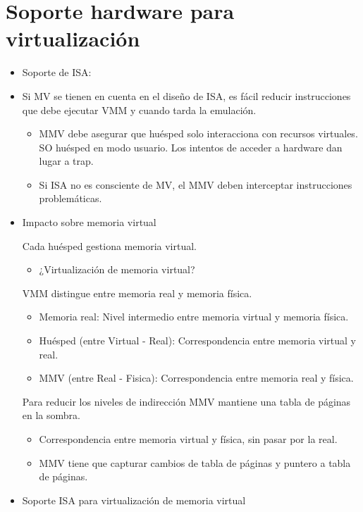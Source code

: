 \documentclass[12pt, twoside, openright]{report} %
\begin{document}
    
\section{Soporte hardware para virtualización}

  \begin{itemize}
  \item
    Soporte de ISA:
  \item
    Si MV se tienen en cuenta en el diseño de ISA, es fácil reducir
    instrucciones que debe ejecutar VMM y cuando tarda la emulación.

    \begin{itemize}
    
    \item
      MMV debe asegurar que huésped solo interacciona con recursos
      virtuales. SO huésped en modo usuario. Los intentos de acceder a
      hardware dan lugar a trap.
    \item
      Si ISA no es consciente de MV, el MMV deben interceptar
      instrucciones problemáticas.
    \end{itemize}
  \item
    Impacto sobre memoria virtual

   Cada huésped gestiona memoria virtual.
\begin{itemize}
  \item ¿Virtualización de memoria virtual?

\end{itemize}
VMM distingue entre memoria real y memoria física.
\begin{itemize}
  \item Memoria real: Nivel intermedio entre memoria virtual y memoria física.
  \item Huésped (entre Virtual - Real): Correspondencia entre memoria virtual y real.
  \item MMV (entre Real - Fisica): Correspondencia entre memoria real y física.
\end{itemize}
Para reducir los niveles de indirección MMV mantiene una
tabla de páginas en la sombra.
\begin{itemize}
  \item Correspondencia entre memoria virtual y física, sin pasar por la real.
  \item MMV tiene que capturar cambios de tabla de páginas y puntero a tabla de páginas.
\end{itemize}

  \item
    Soporte ISA para virtualización de memoria virtual
    

\end{itemize}
\end{document}
